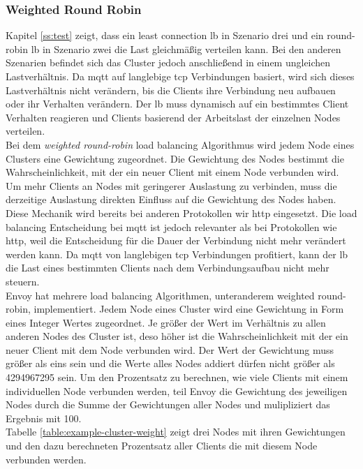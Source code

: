 \subsubsection{Weighted Round Robin} \label{ss:weighted-rr}
Kapitel \ref{ss:test} zeigt, dass ein least connection \acl{lb} in Szenario drei und ein round-robin \ac{lb} in Szenario zwei die Last gleichmä{\ss}ig verteilen kann. Bei den anderen Szenarien befindet sich das Cluster jedoch anschlie{\ss}end in einem ungleichen Lastverhältnis. Da \ac{mqtt} auf langlebige \ac{tcp} Verbindungen basiert, wird sich dieses Lastverhältnis nicht verändern, bis die Clients ihre Verbindung neu aufbauen oder ihr Verhalten verändern.
Der \ac{lb} muss dynamisch auf ein bestimmtes Client Verhalten reagieren und Clients basierend der Arbeitslast der einzelnen Nodes verteilen.
\\
Bei dem \textit{weighted round-robin} load balancing Algorithmus wird jedem Node eines Clusters eine Gewichtung zugeordnet. Die Gewichtung des Nodes bestimmt die Wahrscheinlichkeit, mit der ein neuer Client mit einem Node verbunden wird.
Um mehr Clients an Nodes mit geringerer Auslastung zu verbinden, muss die derzeitige Auslastung direkten Einfluss auf die Gewichtung des Nodes haben.
Diese Mechanik wird bereits bei anderen Protokollen wir \ac{http} eingesetzt.
Die load balancing Entscheidung bei \ac{mqtt} ist jedoch relevanter als bei Protokollen wie \ac{http}, weil die Entscheidung für die Dauer der Verbindung nicht mehr verändert werden kann. Da \ac{mqtt} von langlebigen \ac{tcp} Verbindungen profitiert, kann der \ac{lb} die Last eines bestimmten Clients nach dem Verbindungsaufbau nicht mehr steuern.
\\
Envoy hat mehrere load balancing Algorithmen, unteranderem weighted round-robin, implementiert. Jedem Node eines Cluster wird eine Gewichtung in Form eines Integer Wertes zugeordnet. Je grö{\ss}er der Wert im Verhältnis zu allen anderen Nodes des Cluster ist, deso höher ist die Wahrscheinlichkeit mit der ein neuer Client mit dem Node verbunden wird. Der Wert der Gewichtung muss grö{\ss}er als eins sein und die Werte alles Nodes addiert dürfen nicht grö{\ss}er als 4294967295 sein.
Um den Prozentsatz zu berechnen, wie viele Clients mit einem individuellen Node verbunden werden, teil Envoy die Gewichtung des jeweiligen Nodes durch die Summe der Gewichtungen aller Nodes und mulipliziert das Ergebnis mit 100.
\cite{SupportedLoadBalancers}
\\
Tabelle \ref{table:example-cluster-weight} zeigt drei Nodes mit ihren Gewichtungen und den dazu berechneten Prozentsatz aller Clients die mit diesem Node verbunden werden.
